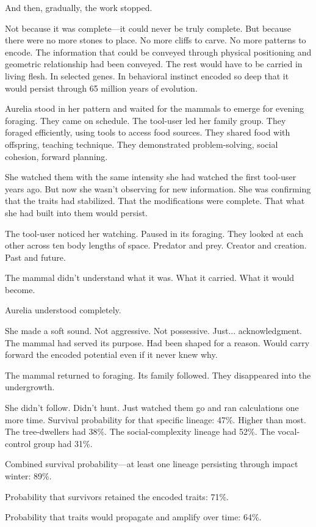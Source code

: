 And then, gradually, the work stopped.

Not because it was complete—it could never be truly complete. But because there were no more stones to place. No more cliffs to carve. No more patterns to encode. The information that could be conveyed through physical positioning and geometric relationship had been conveyed. The rest would have to be carried in living flesh. In selected genes. In behavioral instinct encoded so deep that it would persist through 65 million years of evolution.

Aurelia stood in her pattern and waited for the mammals to emerge for evening foraging. They came on schedule. The tool-user led her family group. They foraged efficiently, using tools to access food sources. They shared food with offspring, teaching technique. They demonstrated problem-solving, social cohesion, forward planning.

She watched them with the same intensity she had watched the first tool-user years ago. But now she wasn't observing for new information. She was confirming that the traits had stabilized. That the modifications were complete. That what she had built into them would persist.

The tool-user noticed her watching. Paused in its foraging. They looked at each other across ten body lengths of space. Predator and prey. Creator and creation. Past and future.

The mammal didn't understand what it was. What it carried. What it would become.

Aurelia understood completely.

She made a soft sound. Not aggressive. Not possessive. Just... acknowledgment. The mammal had served its purpose. Had been shaped for a reason. Would carry forward the encoded potential even if it never knew why.

The mammal returned to foraging. Its family followed. They disappeared into the undergrowth.

She didn't follow. Didn't hunt. Just watched them go and ran calculations one more time. Survival probability for that specific lineage: 47\%. Higher than most. The tree-dwellers had 38\%. The social-complexity lineage had 52\%. The vocal-control group had 31\%.

Combined survival probability—at least one lineage persisting through impact winter: 89\%.

Probability that survivors retained the encoded traits: 71\%.

Probability that traits would propagate and amplify over time: 64\%.

